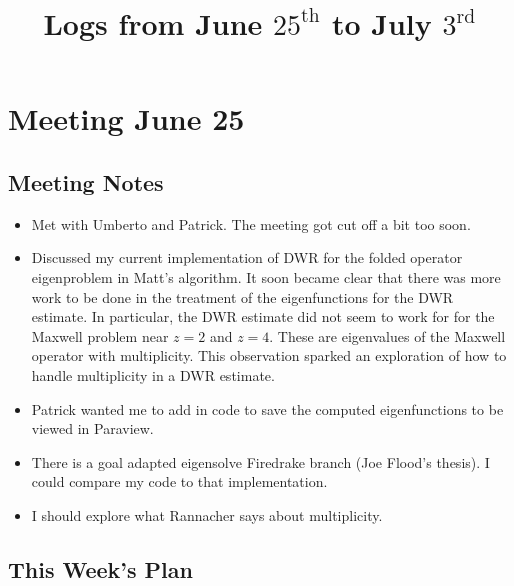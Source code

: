 \documentclass[12pt,a4paper]{article}
\title{Logs from June $25^{\text{th}}$ to July $3^{\text{rd}}$}
\author{}
\date{}
\begin{document}
\maketitle

\section{Meeting June 25}









\subsection{Meeting Notes}

\begin{itemize}
    \item Met with Umberto and Patrick. The meeting got cut off a bit too soon.
    \item Discussed my current implementation of DWR for the folded operator eigenproblem in Matt's algorithm. It soon became clear that there was more work to be done in the treatment of the eigenfunctions for the DWR estimate. In particular, the DWR estimate did not seem to work for for the Maxwell problem near $z=2$ and $z=4.$ These are eigenvalues of the Maxwell operator with multiplicity. This observation sparked an exploration of how to handle multiplicity in a DWR estimate.
    \item Patrick wanted me to add in code to save the computed eigenfunctions to be viewed in Paraview. 
    \item There is a goal adapted eigensolve Firedrake branch (Joe Flood's thesis). I could compare my code to that implementation.
    \item I should explore what Rannacher says about multiplicity. 
\end{itemize}



\subsection{This Week's Plan}
\end{document}
